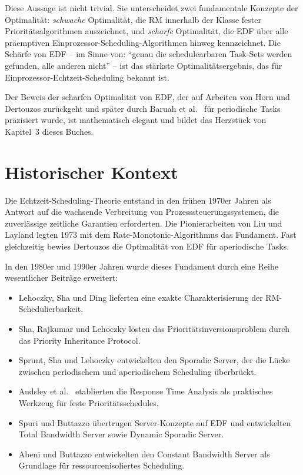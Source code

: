 ﻿\documentclass[a4paper,12pt]{report}
\theoremstyle{definition}
\begin{document}
Diese Aussage ist nicht trivial. Sie unterscheidet zwei fundamentale Konzepte
der Optimalität: \emph{schwache} Optimalität, die RM innerhalb der Klasse
fester Prioritätsalgorithmen auszeichnet, und \emph{scharfe} Optimalität,
die EDF über alle präemptiven Einprozessor-Scheduling-Algorithmen hinweg
kennzeichnet. Die Schärfe von EDF -- im Sinne von: ``genau die schedulearbaren
Task-Sets werden gefunden, alle anderen nicht'' -- ist das stärkste
Optimalitätsergebnis, das für Einprozessor-Echtzeit-Scheduling bekannt ist.

Der Beweis der scharfen Optimalität von EDF, der auf Arbeiten von Horn
\cite{Horn1974} und Dertouzos \cite{Dertouzos1974} zurückgeht und später
durch Baruah et al.\ \cite{Baruah1990} für periodische Tasks präzisiert wurde,
ist mathematisch elegant und bildet das Herzstück von Kapitel~3 dieses Buches.

\section*{Historischer Kontext}

Die Echtzeit-Scheduling-Theorie entstand in den frühen 1970er Jahren als
Antwort auf die wachsende Verbreitung von Prozesssteuerungssystemen, die
zuverlässige zeitliche Garantien erforderten. Die Pionierarbeiten von Liu und
Layland \cite{Liu1973} legten 1973 mit dem Rate-Monotonic-Algorithmus das
Fundament. Fast gleichzeitig bewies Dertouzos \cite{Dertouzos1974} die
Optimalität von EDF für aperiodische Tasks.

In den 1980er und 1990er Jahren wurde dieses Fundament durch eine Reihe
wesentlicher Beiträge erweitert:
\begin{itemize}
	\item Lehoczky, Sha und Ding \cite{Lehoczky1989} lieferten eine exakte
	      Charakterisierung der RM-Schedulierbarkeit.
	\item Sha, Rajkumar und Lehoczky \cite{Sha1990} lösten das Prioritätsinversionsproblem
	      durch das Priority Inheritance Protocol.
	\item Sprunt, Sha und Lehoczky \cite{Sprunt1989} entwickelten den Sporadic Server,
	      der die Lücke zwischen periodischem und aperiodischem Scheduling überbrückt.
	\item Audsley et al.\ \cite{Audsley1993} etablierten die Response Time Analysis
	      als praktisches Werkzeug für feste Prioritätsschedules.
	\item Spuri und Buttazzo \cite{Spuri1996} übertrugen Server-Konzepte auf
	      EDF und entwickelten Total Bandwidth Server sowie Dynamic Sporadic Server.
	\item Abeni und Buttazzo \cite{Abeni1998} entwickelten den Constant Bandwidth
	      Server als Grundlage für ressourcenisoliertes Scheduling.
\end{itemize}
\end{document}

